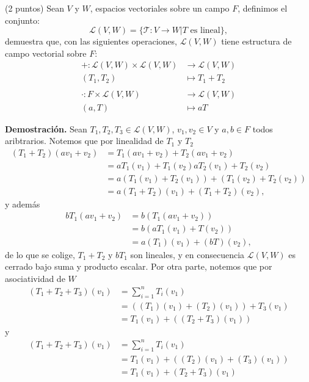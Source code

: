 \documentclass[11pt]{scrartcl}
\begin{document}
\newpage
\begin{mdframed}[style=mdpurplebox, frametitle={Ejercicio 5, Tarea 11, Álgebra Lineal I}]
    (2 puntos) Sean $V$ y $W$, espacios vectoriales sobre un campo $F$, definimos el conjunto:
    \begin{equation*}
        \mathcal{L}(V,W) = \{\mathcal{T}:V\rightarrow W | T\text{ es lineal}\},
    \end{equation*}
    demuestra que, con las siguientes operaciones, $\mathcal{L}(V,W)$ tiene estructura de campo vectorial sobre $F$:
    \begin{align*}
        +:\mathcal{L}(V,W)\times \mathcal{L}(V,W) &\rightarrow \mathcal{L}(V,W) \\
        (T_1,T_2) &\mapsto T_1+T_2 \\ \\
        \cdot :F\times \mathcal{L}(V,W) &\rightarrow \mathcal{L}(V,W) \\
        (a,T) &\mapsto aT
    \end{align*}
\end{mdframed}
\textbf{Demostración.} Sean $T_1,T_2,T_3 \in \mathcal{L}\left(V,W\right)$, $v_1,v_2 \in V$ y $a,b \in F$ todos aribtrarios. Notemos que
por linealidad de $T_1$ y $T_2$
\begin{align*}
    (T_1+T_2)(av_1+v_2) &= T_1(av_1+v_2) + T_2(av_1+v_2) \\
    &= aT_1(v_1)+T_1(v_2) aT_2(v_1)+T_2(v_2) \\
    &= a(T_1(v_1)+T_2(v_1)) + (T_1(v_2)+T_2(v_2)) \\
    &= a(T_1+T_2)(v_1)+(T_1+T_2)(v_2),
\end{align*}
y además
\begin{align*}
    bT_1(av_1+v_2) &= b(T_1(av_1+v_2)) \\
    &=b(aT_1(v_1)+T(v_2)) \\
    &=a(T_1)(v_1)+(bT)(v_2),
\end{align*}
de lo que se colige, $T_1+T_2$ y $bT_1$ son lineales, y en consecuencia $\mathcal{L}(V,W)$ es cerrado bajo suma y producto escalar.
Por otra parte, notemos que por asociatividad de $W$
\begin{align*}
    (T_1+T_2+T_3)(v_1) &= \sum_{i=1}^{n}T_i(v_1) \\
    &= \left((T_1)(v_1)+(T_2)(v_1)\right) + T_3(v_1) \\
    &= T_1(v_1)+\left((T_2+T_3)(v_1)\right)
\end{align*}
y
\begin{align*}
    (T_1+T_2+T_3)(v_1) &= \sum_{i=1}^{n}T_i(v_1) \\
    &= T_1(v_1)+\left((T_2)(v_1)+(T_3)(v_1)\right)\\
    &=T_1(v_1)+(T_2+T_3)(v_1)
\end{align*}
\end{document}
